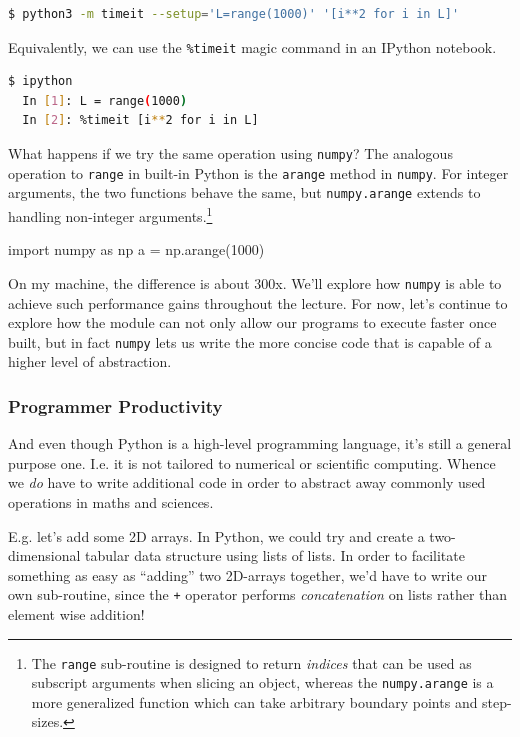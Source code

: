 \documentclass[12pt,letterpaper,twoside]{article}
\begin{document}
\begin{lstlisting}[language=bash,basicstyle=\small]
  $ python3 -m timeit --setup='L=range(1000)' '[i**2 for i in L]'
\end{lstlisting}

Equivalently, we can use the \texttt{\%timeit} magic command in an
IPython notebook.

\begin{lstlisting}[language=bash,basicstyle=\small]
  $ ipython
  In [1]: L = range(1000)
  In [2]: %timeit [i**2 for i in L]
\end{lstlisting}

What happens if we try the same operation using \texttt{numpy}? The
analogous operation to \texttt{range} in built-in Python is the
\texttt{arange} method in \texttt{numpy}. For integer arguments, the
two functions behave the same, but \texttt{numpy.arange} extends to
handling non-integer arguments.\footnote{The \texttt{range}
  sub-routine is designed to return \emph{indices} that can be used as
  subscript arguments when slicing an object, whereas the
  \texttt{numpy.arange} is a more generalized function which can take
  arbitrary boundary points and step-sizes.}

\begin{python}
  import numpy as np
  a = np.arange(1000)
\end{python}

On my machine, the difference is about 300x.
We'll explore how \texttt{numpy} is able to achieve such
performance gains throughout the lecture. For now, let's continue to
explore how the module can not only allow our programs to execute
faster once built, but in fact \texttt{numpy} lets us write the more
concise code that is capable of a higher level of abstraction. 

\subsubsection{Programmer Productivity}
And even though Python is a high-level programming language, it's
still a general purpose one. I.e. it is not tailored to numerical or
scientific computing. Whence we \emph{do} have to write additional
code in order to abstract away commonly used operations in maths and
sciences.

E.g. let's add some 2D arrays. 
In Python, we could try and create a two-dimensional tabular data
structure using lists of lists. In order to facilitate something as
easy as ``adding'' two 2D-arrays together, we'd have to write our own
sub-routine, since the \texttt{+} operator performs
\emph{concatenation} on lists rather than element wise addition!
\end{document}
